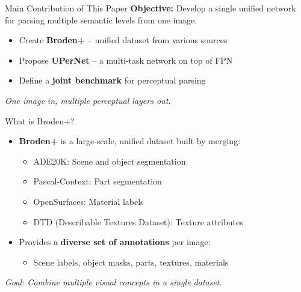 \documentclass{beamer}
\begin{document}

\begin{frame}{Main Contribution of This Paper}
  \textbf{Objective:} Develop a single unified network for parsing multiple semantic levels from one image.

  \vspace{0.5cm}

  \begin{itemize}
    \item Create \textbf{Broden+} – unified dataset from various sources
    \item Propose \textbf{UPerNet} – a multi-task network on top of FPN
    \item Define a \textbf{joint benchmark} for perceptual parsing
  \end{itemize}

  \vfill
  \textit{One image in, multiple perceptual layers out.}
\end{frame}


\begin{frame}{What is Broden+?}
  \begin{itemize}
    \item \textbf{Broden+} is a large-scale, unified dataset built by merging:
    \begin{itemize}
      \item ADE20K: Scene and object segmentation
      \item Pascal-Context: Part segmentation
      \item OpenSurfaces: Material labels
      \item DTD (Describable Textures Dataset): Texture attributes
    \end{itemize}
    \item Provides a \textbf{diverse set of annotations} per image:
    \begin{itemize}
      \item Scene labels, object masks, parts, textures, materials
    \end{itemize}
  \end{itemize}
  \vfill
  \textit{Goal: Combine multiple visual concepts in a single dataset.}
\end{frame}
\end{document}
